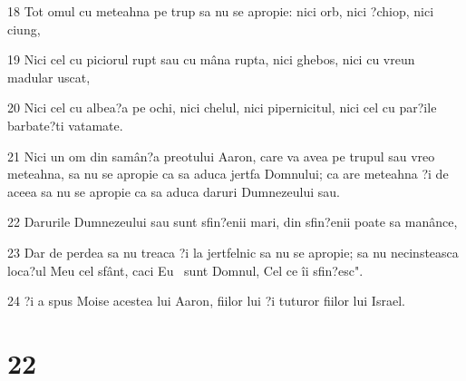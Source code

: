 \par 18 Tot omul cu meteahna pe trup sa nu se apropie: nici orb, nici ?chiop, nici ciung,
\par 19 Nici cel cu piciorul rupt sau cu mâna rupta, nici ghebos, nici cu vreun madular uscat,
\par 20 Nici cel cu albea?a pe ochi, nici chelul, nici pipernicitul, nici cel cu par?ile barbate?ti vatamate.
\par 21 Nici un om din samân?a preotului Aaron, care va avea pe trupul sau vreo meteahna, sa nu se apropie ca sa aduca jertfa Domnului; ca are meteahna ?i de aceea sa nu se apropie ca sa aduca daruri Dumnezeului sau.
\par 22 Darurile Dumnezeului sau sunt sfin?enii mari, din sfin?enii poate sa manânce,
\par 23 Dar de perdea sa nu treaca ?i la jertfelnic sa nu se apropie; sa nu necinsteasca loca?ul Meu cel sfânt, caci Eu  sunt Domnul, Cel ce îi sfin?esc".
\par 24 ?i a spus Moise acestea lui Aaron, fiilor lui ?i tuturor fiilor lui Israel.

\chapter{22}

